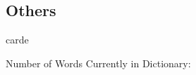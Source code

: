 \begin{multicols*}{2}
\section{Others}

\begin{description}[leftmargin=*]
    \begin{dictentry}{carde}{}
    \end{dictentry}
\end{description}

\end{multicols*}
\vspace{\fill}
Number of Words Currently in Dictionary: \thedictwordcount